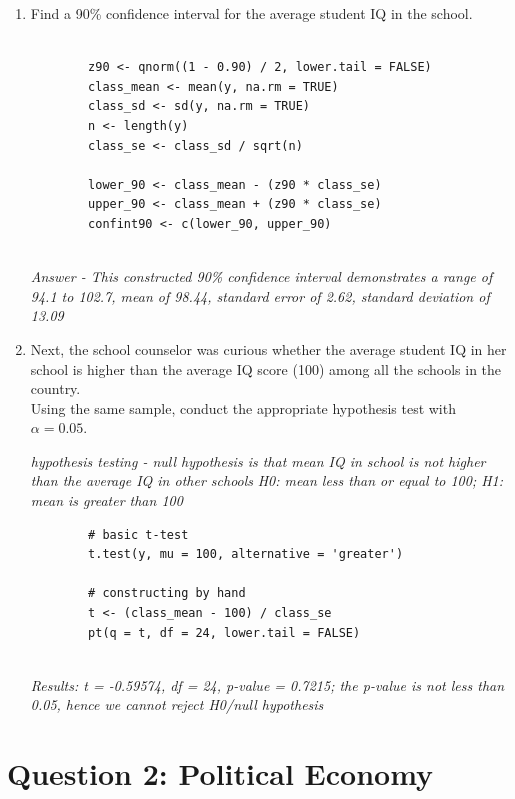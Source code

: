 \documentclass[12pt,letterpaper]{article}
\begin{document}
	\begin{enumerate}
		\item Find a 90\% confidence interval for the average student IQ in the school.\\
		
		\begin{verbatim}
		
		z90 <- qnorm((1 - 0.90) / 2, lower.tail = FALSE)
		class_mean <- mean(y, na.rm = TRUE)
		class_sd <- sd(y, na.rm = TRUE)
		n <- length(y)
		class_se <- class_sd / sqrt(n)
		
		lower_90 <- class_mean - (z90 * class_se)
		upper_90 <- class_mean + (z90 * class_se)
		confint90 <- c(lower_90, upper_90)
		
		\end{verbatim}
		
		\textit{Answer - This constructed 90\% confidence interval demonstrates a range of 94.1 to 102.7, mean of 98.44, standard error of 2.62, standard deviation of 13.09}
		
		\item Next, the school counselor was curious  whether  the average student IQ in her school is higher than the average IQ score (100) among all the schools in the country.\\ 
		
		\noindent Using the same sample, conduct the appropriate hypothesis test with $\alpha=0.05$.
	
		\textit{hypothesis testing - null hypothesis is that mean IQ in school is not higher than the average IQ in other schools}
		\textit{H0: mean less than or equal to 100; H1: mean is greater than 100}
		
		\begin{verbatim}
		# basic t-test
		t.test(y, mu = 100, alternative = 'greater')
		
		# constructing by hand
		t <- (class_mean - 100) / class_se
		pt(q = t, df = 24, lower.tail = FALSE)
		
		\end{verbatim}
		\textit{Results: t = -0.59574, df = 24, p-value = 0.7215; the p-value is not less than 0.05, hence we cannot reject H0/null hypothesis}
		
	\end{enumerate}
	
	\newpage
	
	\section*{Question 2: Political Economy}
	
\end{document}
